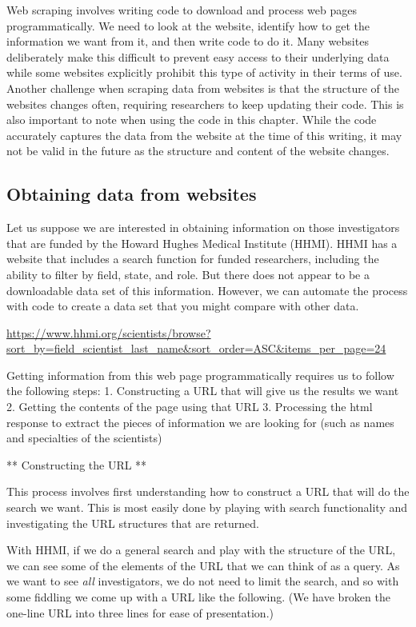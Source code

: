 \documentclass[]{krantz}
\begin{document}
Web scraping involves writing code to download and process web pages
programmatically. We need to look at the website, identify how to get
the information we want from it, and then write code to do it. Many
websites deliberately make this difficult to prevent easy access to
their underlying data while some websites explicitly prohibit this type
of activity in their terms of use. Another challenge when scraping data
from websites is that the structure of the websites changes often,
requiring researchers to keep updating their code. This is also
important to note when using the code in this chapter. While the code
accurately captures the data from the website at the time of this
writing, it may not be valid in the future as the structure and content
of the website changes.

\subsection{Obtaining data from
websites}\label{obtaining-data-from-websites}

Let us suppose we are interested in obtaining information on those
investigators that are funded by the Howard Hughes Medical Institute
(HHMI). HHMI has a website that includes a search function for funded
researchers, including the ability to filter by field, state, and role.
But there does not appear to be a downloadable data set of this
information. However, we can automate the process with code to create a
data set that you might compare with other data.

\url{https://www.hhmi.org/scientists/browse?sort_by=field_scientist_last_name\&sort_order=ASC\&items_per_page=24}

Getting information from this web page programmatically requires us to
follow the following steps: 1. Constructing a URL that will give us the
results we want 2. Getting the contents of the page using that URL 3.
Processing the html response to extract the pieces of information we are
looking for (such as names and specialties of the scientists)

** Constructing the URL **

This process involves first understanding how to construct a URL that
will do the search we want. This is most easily done by playing with
search functionality and investigating the URL structures that are
returned.

With HHMI, if we do a general search and play with the structure of the
URL, we can see some of the elements of the URL that we can think of as
a query. As we want to see \emph{all} investigators, we do not need to
limit the search, and so with some fiddling we come up with a URL like
the following. (We have broken the one-line URL into three lines for
ease of presentation.)
\end{document}
